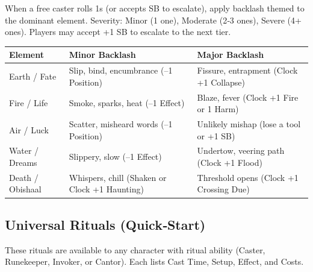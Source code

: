When a free caster rolls 1s (or accepts SB to escalate), apply backlash themed to the dominant element. Severity: Minor (1 one), Moderate (2‑3 ones), Severe (4+ ones). Players may accept +1 SB to escalate to the next tier.

\begin{center}
\small
\begin{tabularx}{\textwidth}{l X X}
\toprule
\textbf{Element} & \textbf{Minor Backlash} & \textbf{Major Backlash} \\
\midrule
Earth / Fate & Slip, bind, encumbrance (--1 Position) & Fissure, entrapment (Clock +1 Collapse) \\
Fire / Life & Smoke, sparks, heat (--1 Effect) & Blaze, fever (Clock +1 Fire or 1 Harm) \\
Air / Luck & Scatter, misheard words (--1 Position) & Unlikely mishap (lose a tool or +1 SB) \\
Water / Dreams & Slippery, slow (--1 Effect) & Undertow, veering path (Clock +1 Flood) \\
Death / Obishaal & Whispers, chill (Shaken or Clock +1 Haunting) & Threshold opens (Clock +1 Crossing Due) \\
\bottomrule
\end{tabularx}
\end{center}

\subsection{Universal Rituals (Quick‑Start)}

These rituals are available to any character with ritual ability (Caster, Runekeeper, Invoker, or Cantor). Each lists Cast Time, Setup, Effect, and Costs.


